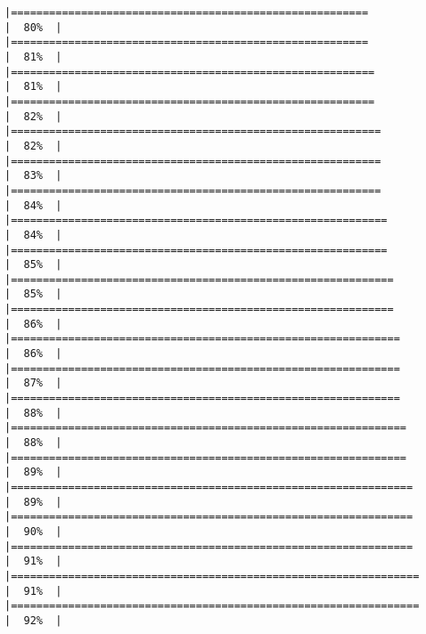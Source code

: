 \documentclass[
]{article}
\begin{document}
\begin{verbatim}
|========================================================              |  80%  |                                                                              |========================================================              |  81%  |                                                                              |=========================================================             |  81%  |                                                                              |=========================================================             |  82%  |                                                                              |==========================================================            |  82%  |                                                                              |==========================================================            |  83%  |                                                                              |==========================================================            |  84%  |                                                                              |===========================================================           |  84%  |                                                                              |===========================================================           |  85%  |                                                                              |============================================================          |  85%  |                                                                              |============================================================          |  86%  |                                                                              |=============================================================         |  86%  |                                                                              |=============================================================         |  87%  |                                                                              |=============================================================         |  88%  |                                                                              |==============================================================        |  88%  |                                                                              |==============================================================        |  89%  |                                                                              |===============================================================       |  89%  |                                                                              |===============================================================       |  90%  |                                                                              |===============================================================       |  91%  |                                                                              |================================================================      |  91%  |                                                                              |================================================================      |  92%  |                                                                              
\end{verbatim}
\end{document}
